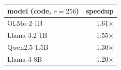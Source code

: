 \begin{tabular}{lr}
\toprule
model (code, $r{=}256$) & speedup \\
\midrule
OLMo-2-1B & 1.61$\times$ \\
Llama-3.2-1B & 1.55$\times$ \\
Qwen2.5-1.5B & 1.30$\times$ \\
Llama-3-8B & 1.20$\times$ \\
\bottomrule
\end{tabular}
